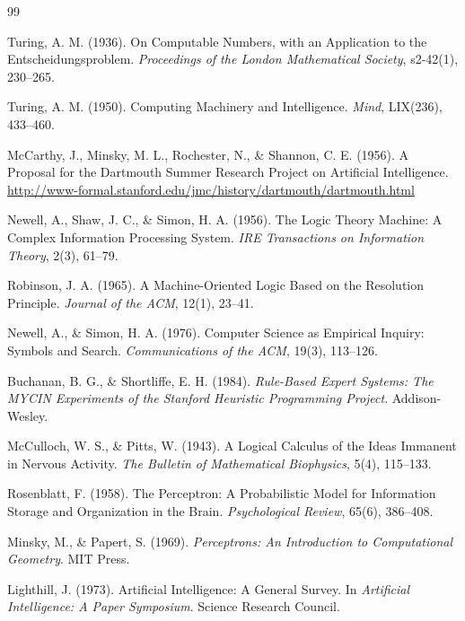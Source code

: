 \begin{thebibliography}{99}

Turing, A. M. (1936). On Computable Numbers, with an Application to the Entscheidungsproblem.
\textit{Proceedings of the London Mathematical Society}, s2-42(1), 230--265.

Turing, A. M. (1950). Computing Machinery and Intelligence.
\textit{Mind}, LIX(236), 433--460.

McCarthy, J., Minsky, M. L., Rochester, N., \& Shannon, C. E. (1956). A Proposal for the Dartmouth Summer Research Project on Artificial Intelligence.
\url{http://www-formal.stanford.edu/jmc/history/dartmouth/dartmouth.html}

Newell, A., Shaw, J. C., \& Simon, H. A. (1956). The Logic Theory Machine: A Complex Information Processing System.
\textit{IRE Transactions on Information Theory}, 2(3), 61--79.

Robinson, J. A. (1965). A Machine-Oriented Logic Based on the Resolution Principle.
\textit{Journal of the ACM}, 12(1), 23--41.

Newell, A., \& Simon, H. A. (1976). Computer Science as Empirical Inquiry: Symbols and Search.
\textit{Communications of the ACM}, 19(3), 113--126.

Buchanan, B. G., \& Shortliffe, E. H. (1984). \textit{Rule-Based Expert Systems: The MYCIN Experiments of the Stanford Heuristic Programming Project}.
Addison-Wesley.

McCulloch, W. S., \& Pitts, W. (1943). A Logical Calculus of the Ideas Immanent in Nervous Activity.
\textit{The Bulletin of Mathematical Biophysics}, 5(4), 115--133.

Rosenblatt, F. (1958). The Perceptron: A Probabilistic Model for Information Storage and Organization in the Brain.
\textit{Psychological Review}, 65(6), 386--408.

Minsky, M., \& Papert, S. (1969). \textit{Perceptrons: An Introduction to Computational Geometry}. MIT Press.

Lighthill, J. (1973). Artificial Intelligence: A General Survey. In \textit{Artificial Intelligence: A Paper Symposium}. Science Research Council.


\end{thebibliography}
